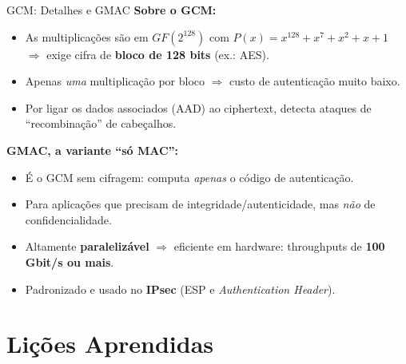 \documentclass{beamer}
\begin{document}
\begin{frame}{GCM: Detalhes e GMAC}
    \textbf{Sobre o GCM:}
    \begin{itemize}
        \footnotesize
        \item As multiplicações são em $GF(2^{128})$ com $P(x) = x^{128} + x^7 + x^2 + x + 1$ $\Rightarrow$ exige cifra de \textbf{bloco de 128 bits} (ex.: AES).
        \item Apenas \emph{uma} multiplicação por bloco $\Rightarrow$ custo de autenticação muito baixo.
        \item Por ligar os dados associados (AAD) ao ciphertext, detecta ataques de ``recombinação'' de cabeçalhos.
    \end{itemize}
    \bigskip
    \textbf{GMAC, a variante ``só MAC'':}
    \begin{itemize}
        \footnotesize
        \item É o GCM \alert{sem cifragem}: computa \emph{apenas} o código de autenticação.
        \item Para aplicações que precisam de integridade/autenticidade, mas \emph{não} de confidencialidade.
        \item Altamente \textbf{paralelizável} $\Rightarrow$ eficiente em hardware: throughputs de \textbf{100 Gbit/s ou mais}.
        \item Padronizado e usado no \textbf{IPsec} (ESP e \textit{Authentication Header}).
    \end{itemize}
\end{frame}

\section{Lições Aprendidas}
\end{document}
